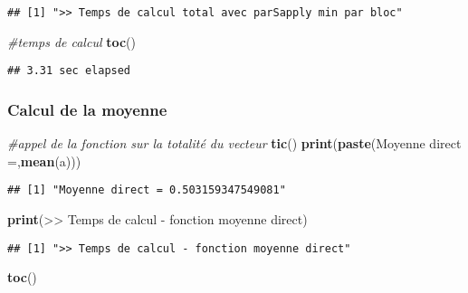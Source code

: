 \documentclass[
]{article}
\newenvironment{Shaded}{\begin{snugshade}}{\end{snugshade}}
\newcommand{\CommentTok}[1]{\textcolor[rgb]{0.56,0.35,0.01}{\textit{#1}}}
\newcommand{\FunctionTok}[1]{\textcolor[rgb]{0.13,0.29,0.53}{\textbf{#1}}}
\newcommand{\NormalTok}[1]{#1}
\newcommand{\StringTok}[1]{\textcolor[rgb]{0.31,0.60,0.02}{#1}}
\begin{document}
\begin{verbatim}
## [1] ">> Temps de calcul total avec parSapply min par bloc"
\end{verbatim}

\begin{Shaded}
\begin{Highlighting}[]
\CommentTok{\#temps de calcul}
\FunctionTok{toc}\NormalTok{()}
\end{Highlighting}
\end{Shaded}

\begin{verbatim}
## 3.31 sec elapsed
\end{verbatim}

\hypertarget{calcul-de-la-moyenne}{%
\subsubsection{Calcul de la moyenne}\label{calcul-de-la-moyenne}}

\begin{Shaded}
\begin{Highlighting}[]
\CommentTok{\#appel de la fonction sur la totalité du vecteur}
\FunctionTok{tic}\NormalTok{()}
\FunctionTok{print}\NormalTok{(}\FunctionTok{paste}\NormalTok{(}\StringTok{\textquotesingle{}Moyenne direct =\textquotesingle{}}\NormalTok{,}\FunctionTok{mean}\NormalTok{(a)))}
\end{Highlighting}
\end{Shaded}

\begin{verbatim}
## [1] "Moyenne direct = 0.503159347549081"
\end{verbatim}

\begin{Shaded}
\begin{Highlighting}[]
\FunctionTok{print}\NormalTok{(}\StringTok{\textquotesingle{}\textgreater{}\textgreater{} Temps de calcul {-} fonction moyenne direct\textquotesingle{}}\NormalTok{)}
\end{Highlighting}
\end{Shaded}

\begin{verbatim}
## [1] ">> Temps de calcul - fonction moyenne direct"
\end{verbatim}

\begin{Shaded}
\begin{Highlighting}[]
\FunctionTok{toc}\NormalTok{()}
\end{Highlighting}
\end{Shaded}
\end{document}
